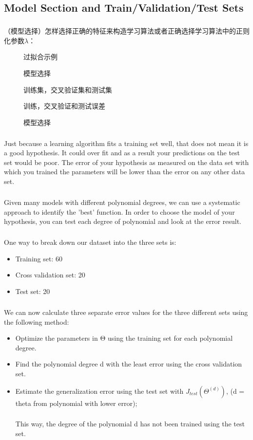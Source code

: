 \documentclass{article}
\begin{document}
\begin{CJK}{UTF8}{gbsn}
\subsection{Model Section and Train/Validation/Test Sets}
\subparagraph{}
（模型选择）怎样选择正确的特征来构造学习算法或者正确选择学习算法中的正则化参数$\lambda$：
\begin{figure}[H]
\label{fig:610}
\caption{过拟合示例}
\end{figure}
\begin{figure}[H]
\label{fig:611}
\caption{模型选择}
\end{figure}
\begin{figure}[H]
\label{fig:612}
\caption{训练集，交叉验证集和测试集}
\end{figure}
\begin{figure}[H]
\label{fig:613}
\caption{训练，交叉验证和测试误差}
\end{figure}
\begin{figure}[H]
\label{fig:615}
\caption{模型选择}
\end{figure}
\begin{figure}[H]
\label{fig:616}
\end{figure}
\subparagraph{}
Just because a learning algorithm fits a training set well, that does not mean it is a good hypothesis. It could over fit and as a result your predictions on the test set would be poor. The error of your hypothesis as measured on the data set with which you trained the parameters will be lower than the error on any other data set. 
\subparagraph{}
Given many models with different polynomial degrees, we can use a systematic approach to identify the 'best' function. In order to choose the model of your hypothesis, you can test each degree of polynomial and look at the error result.
\subparagraph{}
One way to break down our dataset into the three sets is:
\begin{itemize}
\item Training set: 60%
\item Cross validation set: 20%
\item Test set: 20%
\end{itemize}
\subparagraph{}
We can now calculate three separate error values for the three different sets using the following method:
\begin{itemize}
\item     Optimize the parameters in Θ using the training set for each polynomial degree.
\item Find the polynomial degree d with the least error using the cross validation set.
\item Estimate the generalization error using the test set with $J_{test}(\Theta^{(d)})$, (d = theta from polynomial with lower error);
\subparagraph{}
This way, the degree of the polynomial d has not been trained using the test set.
\end{itemize}

\end{CJK}
\end{document}
